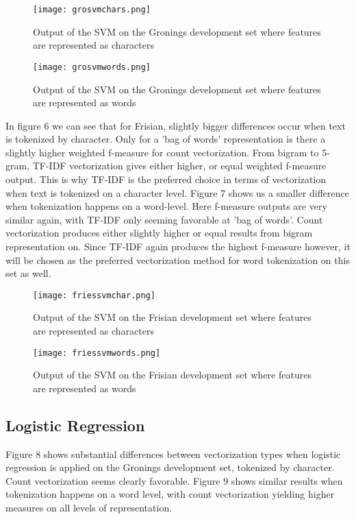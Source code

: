 \documentclass[
10pt, %
a4paper, %
oneside, %
headinclude,footinclude, %
] {book}%
\begin{document}
\begin{figure}[H]
  \texttt{[image: grosvmchars.png]}
  \caption{Output of the SVM on the Gronings development set where features are represented as characters }
\end{figure}

\begin{figure}[H]
  \texttt{[image: grosvmwords.png]}
  \caption{Output of the SVM on the Gronings development set where features are represented as words}
\end{figure}


In figure 6 we can see that for Frisian, slightly bigger differences occur when text is tokenized by character. Only for a 'bag of words' representation is there a slightly higher weighted f-measure for count vectorization. From bigram to 5-gram, TF-IDF vectorization gives either higher, or equal weighted f-measure output. This is why TF-IDF is the preferred choice in terms of vectorization when text is tokenized on a character level.  Figure 7 shows us a smaller difference when tokenization happens on a word-level. Here f-measure outputs are very similar again, with TF-IDF only seeming favorable at 'bag of words'. Count vectorization produces either slightly higher or equal results from bigram representation on. Since TF-IDF again produces the highest f-measure however, it will be chosen as the preferred vectorization method for word tokenization on this set as well. 

\begin{figure}[H]
  \texttt{[image: friessvmchar.png]}
  \caption{Output of the SVM on the Frisian development set where features are represented as characters}
\end{figure}

\begin{figure}[H]
  \texttt{[image: friessvmwords.png]}
  \caption{Output of the SVM on the Frisian development set where features are represented as words}
\end{figure}


\subsection{Logistic Regression}

Figure 8 shows substantial differences between vectorization types when logistic regression is applied on the Gronings development set, tokenized by character. Count vectorization seems clearly favorable. Figure 9 shows similar results when tokenization happens on a word level, with count vectorization yielding higher measures on all levels of representation.
\end{document}
